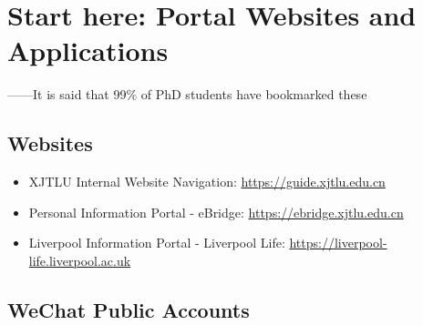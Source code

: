 \chapter{Start here: Portal Websites and Applications}
\label{necessary_resources}

\begin{flushright}
    ——It is said that 99\% of PhD students have bookmarked these
\end{flushright}    

\section{Websites}
\begin{itemize}
    \item XJTLU Internal Website Navigation: \url{https://guide.xjtlu.edu.cn}
    \item Personal Information Portal - eBridge: \url{https://ebridge.xjtlu.edu.cn}
    \item Liverpool Information Portal - Liverpool Life: \url{https://liverpool-life.liverpool.ac.uk}
\end{itemize}

\section{WeChat Public Accounts}

